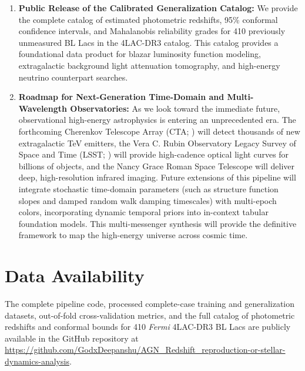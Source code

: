 \documentclass[twocolumn,linenumbers,floatfix]{aastex701}
\begin{document}
\begin{enumerate}
    \item \textbf{Public Release of the Calibrated Generalization Catalog:} We provide the complete catalog of estimated photometric redshifts, 95\% conformal confidence intervals, and Mahalanobis reliability grades for 410 previously unmeasured BL Lacs in the 4LAC-DR3 catalog. This catalog provides a foundational data product for blazar luminosity function modeling, extragalactic background light attenuation tomography, and high-energy neutrino counterpart searches.
    
    \item \textbf{Roadmap for Next-Generation Time-Domain and Multi-Wavelength Observatories:} As we look toward the immediate future, observational high-energy astrophysics is entering an unprecedented era. The forthcoming Cherenkov Telescope Array (CTA; \citealt{Actis2011}) will detect thousands of new extragalactic TeV emitters, the Vera C. Rubin Observatory Legacy Survey of Space and Time (LSST; \citealt{Ivezic2019}) will provide high-cadence optical light curves for billions of objects, and the Nancy Grace Roman Space Telescope will deliver deep, high-resolution infrared imaging. Future extensions of this pipeline will integrate stochastic time-domain parameters (such as structure function slopes and damped random walk damping timescales) with multi-epoch colors, incorporating dynamic temporal priors into in-context tabular foundation models. This multi-messenger synthesis will provide the definitive framework to map the high-energy universe across cosmic time.
\end{enumerate}

\section*{Data Availability}
The complete pipeline code, processed complete-case training and generalization datasets, out-of-fold cross-validation metrics, and the full catalog of photometric redshifts and conformal bounds for 410 \textit{Fermi} 4LAC-DR3 BL Lacs are publicly available in the GitHub repository at \url{https://github.com/GodxDeepanshu/AGN_Redshift_reproduction-or-stellar-dynamics-analysis}.
\end{document}
